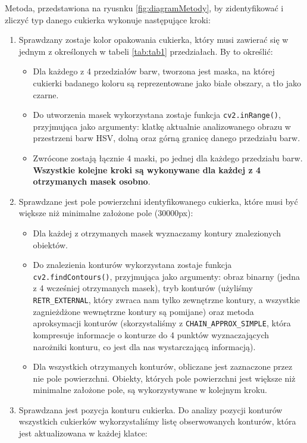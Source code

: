 \documentclass{article}
\begin{document}
Metoda, przedstawiona na ryusnku \ref{fig:diagramMetody}, by zidentyfikować i zliczyć typ danego cukierka wykonuje następujące kroki:
\begin{enumerate}
    \item Sprawdzany zostaje kolor opakowania cukierka, który musi zawierać się w jednym z określonych w tabeli \ref{tab:tab1} przedziałach. By to określić:
    \begin{itemize}
        \item Dla każdego z 4 przedziałów barw, tworzona jest maska, na której cukierki badanego koloru są reprezentowane jako białe obszary, a tło jako czarne.
        \item Do utworzenia masek wykorzystana zostaje funkcja \verb|cv2.inRange()|\cite{inRange}, przyjmująca jako argumenty: klatkę aktualnie analizowanego obrazu w przestrzeni barw HSV, dolną oraz górną granicę danego przedziału barw.
        \item Zwrócone zostają łącznie 4 maski, po jednej dla każdego przedziału barw. \textbf{Wszystkie kolejne kroki są wykonywane dla każdej z 4 otrzymanych masek osobno}.
    \end{itemize}
    \item Sprawdzane jest pole powierzchni identyfikowanego cukierka, które musi być większe niż minimalne założone pole (30000px):
    \begin{itemize}
        \item Dla każdej z otrzymanych masek wyznaczamy kontury znalezionych obiektów.
        \item Do znalezienia konturów wykorzystana zostaje funkcja \verb|cv2.findContours()|\cite{findContours}, przyjmująca jako argumenty: obraz binarny (jedna z 4 wcześniej otrzymanych masek), tryb konturów (użyliśmy \verb|RETR_EXTERNAL|\cite{retrExternal}, który zwraca nam tylko zewnętrzne kontury, a wszystkie zagnieżdżone wewnętrzne kontury są pomijane) oraz metoda aproksymacji konturów (skorzystaliśmy z \verb|CHAIN_APPROX_SIMPLE|\cite{chainApproxSimble}, która kompresuje informacje o konturze do 4 punktów wyznaczających narożniki konturu, co jest dla nas wystarczającą informacją).
        \item Dla wszystkich otrzymanych konturów, obliczane jest zaznaczone przez nie pole powierzchni. Obiekty, których pole powierzchni jest większe niż minimalne założone pole, są wykorzystywane w kolejnym kroku.
    \end{itemize}
    \item Sprawdzana jest pozycja konturu cukierka. Do analizy pozycji konturów wszystkich cukierków wykorzystaliśmy listę obserwowanych konturów, która jest aktualizowana w każdej klatce:

\end{enumerate}
\end{document}
